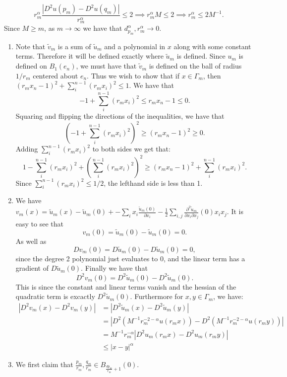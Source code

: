 \documentclass[12pt, a4paper]{article}
\theoremstyle{definition}
\begin{document}
$$r^\alpha_m \frac{|D^2u(p_m) - D^2u(q_m)|}{r_m^\alpha}\leq 2 \implies r_m^\alpha M \leq 2 \implies r_m^\alpha \leq 2M^{-1}.$$
Since $M \geq m$, as $m \to \infty$ we have that $d_{p_m}^\alpha, r_m^\alpha \to 0$. 
\item 
\begin{enumerate}[label = \roman*) ]
	\item Note that $\tilde{v}_m$ is a sum of $\tilde{u}_m$ and a polynomial in $x$ along with some constant terms. Therefore it will be defined exactly where $\tilde{u}_m$ is defined. Since $u_m$ is defined on $B_1(e_n)$, we must have that $\tilde{v}_m$ is defined on the ball of radius $1/r_m$ centered about $e_n$. Thus we wish to show that if $x\in \Gamma_m$, then $(r_mx_n - 1)^2 + \sum_{i}^{n-1}(r_mx_i)^2 \leq 1$. 
We have that 
		$$-1 + \sum_{i}^{n-1} (r_mx_i)^2 \leq r_mx_n - 1 \leq 0.$$
Squaring and flipping the directions of the inequalities, we have that 
$$ \left(-1 + \sum_{i}^{n-1} (r_mx_i)^2  \right)^2 \geq (r_m x_n- 1)^2 \geq 0. $$
Adding $\sum_{i}^{n-1} (r_m x_i)^2$ to both sides we get that:
		$$1 - \sum_{i}^{n-1} (r_mx_i)^2  + \left(\sum_{i}^{n-1} (r_mx_i)^2 \right)^2 \geq (r_mx_n-1)^2 + \sum_{i}^{n-1}(r_mx_i)^2.$$
Since $\sum_{i}^{n-1} (r_mx_i)^2 \leq 1/2$, the lefthand side is less than 1. 
\item We have $v_m(x) =  \tilde{u}_m(x) - \tilde{u}_m(0) + - \sum_i x_i \frac{\tilde{u}_m(0)}{\partial x_i}  - \frac{1}{2} \sum_{i,j} \frac{\partial^2\tilde{u}_m}{\partial x_i \partial x_j}(0) x_ix_j.$
It is easy to see that 
$$v_m(0) = \tilde{u}_m(0) - \tilde{u}_m(0) = 0.$$
As well as
$$Dv_m(0) = D\tilde{u}_m(0) - D\tilde{u}_m(0) =0 ,$$
since the degree 2 polynomial just evaluates to $0$, and the linear term has a gradient of $D\tilde{u}_m(0)$.  
Finally we have that 
$$D^2 v_m(0) = D^2\tilde{u}_m(0) - D^2 \tilde{u}_m(0). $$
This is since the constant and linear terms vanish and the hessian of the quadratic term is excactly $D^2\tilde{u}_m(0)$. Furthermore for $x,y\in \Gamma_m$, we have:
\begin{align*}
 |D^2 v_m(x) - D^2v_m(y)| & = |D^2\tilde{u}_m(x) - D^2\tilde{u}_m(y)|
 \\ & = |D^2(M^{-1}r_m^{-2-\alpha}u(r_m x)) - D^2(M^{-1}r_m^{-2-\alpha}u(r_m y))|
 \\ & = M^{-1}r_m^{-\alpha}|D^2u_m(r_mx) - D^2u_m(r_my)|
 \\ & \leq |x-y|^\alpha \tag{by assumption at points $r_mx,r_my$}
\end{align*}
\item We first claim that $\frac{p_m}{r_m},\frac{q_m}{r_m}\in B_{\frac{dp_m}{r_m}+1}(0)$.

\end{enumerate}
\end{document}
